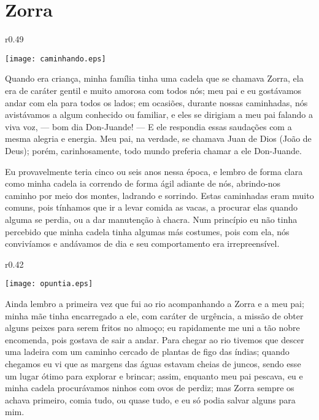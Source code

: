 \cleardoublepage
\newpage
{}
\chapter{Zorra}


\begin{wrapfigure}{r}{0.49\textwidth}
  \begin{center}
  \vspace{-30pt}
    \texttt{[image: caminhando.eps]}
  \end{center}
  \vspace{-20pt}
\end{wrapfigure}
Quando era criança, minha família tinha uma cadela que se chamava Zorra, ela era de caráter gentil e muito amorosa com todos nós; meu pai e eu gostávamos andar com ela para todos os lados; em ocasiões, durante nossas caminhadas, nós avistávamos a algum conhecido ou familiar, e eles se dirigiam a meu pai falando a viva voz, --- bom dia Don-Juande! --- E ele respondia essas saudações com a mesma alegria e energia.
Meu pai, na verdade, se chamava Juan de Dios (João de Deus); porém, carinhosamente, todo mundo preferia chamar a ele Don-Juande.


Eu provavelmente teria cinco ou seis anos nessa época, e lembro de forma clara como minha cadela ia correndo de forma ágil adiante de nós, abrindo-nos caminho por meio dos montes, ladrando e sorrindo.
Estas caminhadas eram muito comuns, pois tínhamos que ir a levar comida as vacas, a procurar elas quando alguma se perdia, ou a dar manutenção à chacra.
Num princípio eu não tinha percebido que minha cadela tinha algumas más costumes, pois com ela, nós convivíamos e andávamos de dia e seu comportamento era irrepreensível. 

\begin{wrapfigure}{r}{0.42\textwidth}
  \begin{center}
  \vspace{-30pt}
    \texttt{[image: opuntia.eps]}
  \end{center}
  \vspace{-20pt}
\end{wrapfigure}
Ainda lembro a primeira vez que fui ao rio acompanhando a Zorra e a meu pai; minha mãe tinha encarregado a ele, com caráter de urgência, a missão de obter alguns peixes para serem fritos no almoço; eu rapidamente me uni a tão nobre encomenda, pois gostava de sair a andar. 
Para chegar ao rio tivemos que descer uma ladeira com um caminho cercado de plantas de figo das índias; quando chegamos eu vi que as margens das águas estavam cheias de juncos, sendo esse um lugar ótimo para explorar e brincar; assim, enquanto meu pai pescava, eu e minha cadela procurávamos ninhos com ovos de perdiz; mas Zorra sempre os achava primeiro, comia tudo, ou quase tudo, e eu só podia salvar alguns para mim.



